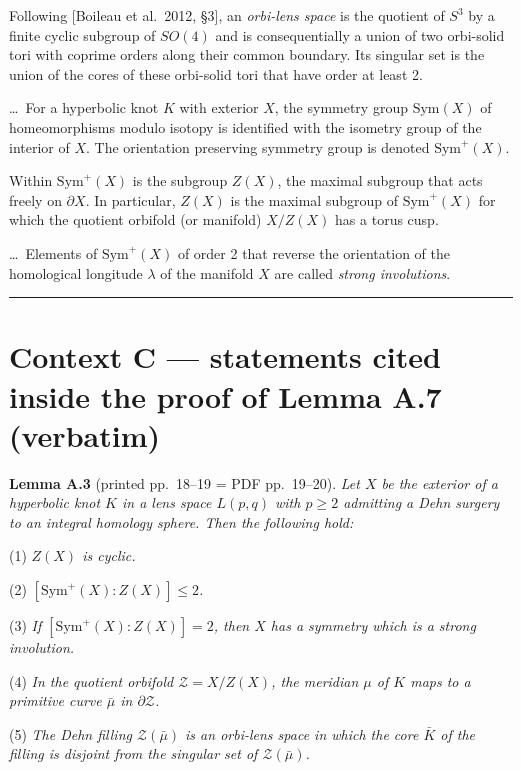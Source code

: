 \documentclass[11pt]{article}
\newcommand{\Sym}{\ensuremath{\mathrm{Sym}}}
\newcommand{\Zs}{\ensuremath{\mathcal{Z}}}   %
\begin{document}
Following [Boileau et al.\ 2012, \S3], an \emph{orbi-lens space} is the quotient of $S^3$ by a
finite cyclic subgroup of $SO(4)$ and is consequentially a union of two orbi-solid tori with coprime
orders along their common boundary. Its singular set is the union of the cores of these orbi-solid
tori that have order at least 2.

\dots\ For a hyperbolic knot $K$ with exterior $X$, the symmetry group $\Sym(X)$ of homeomorphisms
modulo isotopy is identified with the isometry group of the interior of $X$. The orientation
preserving symmetry group is denoted $\Sym^+(X)$.

Within $\Sym^+(X)$ is the subgroup $Z(X)$, the maximal subgroup that acts freely on $\partial X$.
In particular, $Z(X)$ is the maximal subgroup of $\Sym^+(X)$ for which the quotient orbifold
(or manifold) $X/Z(X)$ has a torus cusp.

\dots\ Elements of $\Sym^+(X)$ of order 2 that reverse the orientation of the homological longitude
$\lambda$ of the manifold $X$ are called \emph{strong involutions}.

\bigskip
\hrule
\bigskip

\section*{Context C --- statements cited inside the proof of Lemma A.7 (verbatim)}


\noindent\textbf{Lemma A.3} (printed pp.~18--19 = PDF pp.~19--20). \emph{Let $X$ be the exterior of
a hyperbolic knot $K$ in a lens space $L(p,q)$ with $p \ge 2$ admitting a Dehn surgery to an
integral homology sphere. Then the following hold:}

(1) \emph{$Z(X)$ is cyclic.}

(2) \emph{$[\Sym^+(X) : Z(X)] \le 2$.}

(3) \emph{If $[\Sym^+(X) : Z(X)] = 2$, then $X$ has a symmetry which is a strong involution.}

(4) \emph{In the quotient orbifold $\Zs = X/Z(X)$, the meridian $\mu$ of $K$ maps to a primitive
curve $\bar\mu$ in $\partial\Zs$.}

(5) \emph{The Dehn filling $\Zs(\bar\mu)$ is an orbi-lens space in which the core $\bar K$ of the
filling is disjoint from the singular set of $\Zs(\bar\mu)$.}
\end{document}

